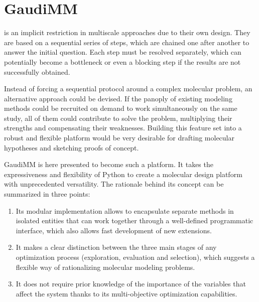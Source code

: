 
\chapter{GaudiMM}
\label{chap:04}


 is an implicit restriction in multiscale approaches due to their own design. They are based on a sequential series of steps, which are chained one after another to answer the initial question. Each step must be resolved separately, which can potentially become a bottleneck or even a blocking step if the results are not successfully obtained.


Instead of forcing a sequential protocol around a complex molecular problem, an alternative approach could be devised. If the panoply of existing modeling methods could be recruited on demand to work simultaneously on the same study, all of them could contribute to solve the problem, multiplying their strengths and compensating their weaknesses. Building this feature set into a robust and flexible platform would be very desirable for drafting molecular hypotheses and sketching proofs of concept.

GaudiMM is here presented to become such a platform. It takes the expressiveness and flexibility of Python to create a molecular design platform with unprecedented versatility. The rationale behind its concept can be summarized in three points:

\begin{enumerate}
	\item Its modular implementation allows to encapsulate separate methods in isolated entities that can work together through a well-defined programmatic interface, which also allows fast development of new extensions.

	\item It makes a clear distinction between the three main stages of any optimization process (exploration, evaluation and selection), which suggests a flexible way of rationalizing molecular modeling problems.

	\item It does not require prior knowledge of the importance of the variables that affect the system thanks to its multi-objective optimization capabilities.
\end{enumerate}

